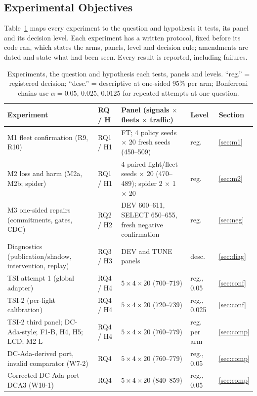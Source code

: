 \subsection{Experimental Objectives}
Table~\ref{tab:expmap} maps every experiment to the question and hypothesis it tests, its panel and its decision level. Each experiment has
a written protocol, fixed before its code ran, which states the arms, panels, level and decision rule; amendments are dated and state what
had been seen. Every result is reported, including failures.
\begin{table}[t]\centering\footnotesize
\caption{Experiments, the question and hypothesis each tests, panels and levels. ``reg.'' = registered decision; ``desc.'' = descriptive
at one-sided 95\% per arm; Bonferroni chains use $\alpha=0.05$, $0.025$, $0.0125$ for repeated attempts at one question.}\label{tab:expmap}
\begin{tabular}{@{}p{5.3cm}p{1.5cm}p{6.0cm}p{2.5cm}l@{}}\toprule
Experiment & RQ / H & Panel (signals $\times$ fleets $\times$ traffic) & Level & Section\\\midrule
M1 fleet confirmation (R9, R10) & RQ1 / H1 & FT; 4 policy seeds $\times$ 20 fresh seeds (450--509) & reg. & \ref{sec:m1}\\
M2 loss and harm (M2a, M2b; spider) & RQ1 / H1 & 4 paired light/fleet seeds $\times$ 20 (470--489); spider 2 $\times$ 1 $\times$ 20 & reg. & \ref{sec:m2}\\
M3 one-sided repairs (commitments, gates, CDC) & RQ2 / H2 & DEV 600--611, SELECT 650--655, fresh negative confirmation & reg. & \ref{sec:neg}\\
Diagnostics (publication/shadow, intervention, replay) & RQ3 / H3 & DEV and TUNE panels & desc. & \ref{sec:diag}\\
TSI attempt 1 (global adapter) & RQ4 / H4 & $5\times4\times20$ (700--719) & reg., 0.05 & \ref{sec:conf}\\
TSI-2 (per-light calibration) & RQ4 / H4 & $5\times4\times20$ (720--739) & reg., 0.025 & \ref{sec:conf}\\
TSI-2 third panel; DC-Ada-style; F1-B, H4, H5; LCD; M2-L & RQ4 / H4 & $5\times4\times20$ (760--779) & reg. per arm & \ref{sec:comp}\\
DC-Ada-derived port, invalid comparator (W7-2) & RQ4 & $5\times4\times20$ (760--779) & reg., 0.05 & \ref{sec:comp}\\
Corrected DC-Ada port DCA3 (W10-1) & RQ4 & $5\times4\times20$ (840--859) & reg., 0.05 & \ref{sec:comp}\\

\end{tabular}
\end{table}
